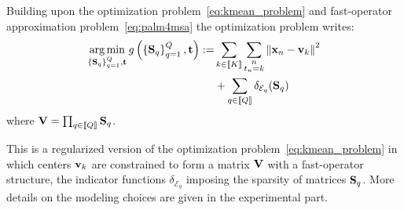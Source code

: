 Building upon the \kmeans optimization problem~\eqref{eq:kmean_problem} and fast-operator approximation problem~\eqref{eq:palm4msa} the \qkmeans optimization problem 
writes:
%
\begin{align}
 \operatorname*{arg\,min}_{\left\{{\mathbf{S}}_q\right\}_{q=1}^{Q}, {\mathbf{t}}} g\left(\left\{{\mathbf{S}}_q\right\}_{q=1}^{Q}, {\mathbf{t}}\right)
 := & \sum_{k\in\left \llbracket K\right \rrbracket} \sum_{\substack{n\\t_n = k}} \left\|{\mathbf{x}}_n -{\mathbf{v}}_k\right\|^2 \nonumber \\
 & + \sum_{q\in\left \llbracket Q\right \rrbracket} \delta_{\mathcal{E}_q}({\mathbf{S}}_q)
 \label{eq:objective}
\end{align}
where ${\mathbf{V}} = \prod_{q\in\left \llbracket Q\right \rrbracket}{\mathbf{S}}_q$.

%
This is a  regularized   version of the \kmeans optimization problem~\eqref{eq:kmean_problem} in which centers ${\mathbf{v}}_k$ are constrained to form a matrix ${\mathbf{V}}$ with a fast-operator structure, the indicator functions $\delta_{\mathcal{E}_q}$ imposing the sparsity of matrices ${\mathbf{S}}_q$.
More details on the modeling choices are given in the experimental part. %

